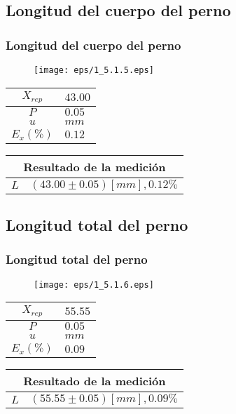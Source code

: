 \documentclass[letter,11pt]{beamer}
\begin{document}
\subsection{Longitud del cuerpo del perno}
\begin{frame}
\frametitle{Longitud del cuerpo del perno}
\vspace*{0.8cm}
\begin{figure}
\centering
\texttt{[image: eps/1\_5.1.5.eps]}
\end{figure}
\vspace*{0.4cm}
\scriptsize
\begin{tabular}{|c|>{\centering}m{1.8cm}<{\centering}|}
\hline
$X_{rep}$ &  $43.00$ \tabularnewline \hline
      $P$ &   $0.05$ \tabularnewline \hline
      $u$ &     $mm$ \tabularnewline \hline
$E_x(\%)$ &   $0.12$ \tabularnewline \hline
\end{tabular}
\quad
\begin{tabular}{|c|>{\centering}m{5.7cm}<{\centering}|}
\hline
\multicolumn{2}{|c|}{\textbf{Resultado de la medición}} \\ \hline
$L$ & $( 43.00\pm0.05)[mm], 0.12\%$ \tabularnewline \hline
\end{tabular}
\end{frame}

\subsection{Longitud total del perno}
\begin{frame}
\frametitle{Longitud total del perno}
\vspace*{0.8cm}
\begin{figure}
\centering
\texttt{[image: eps/1\_5.1.6.eps]}
\end{figure}
\vspace*{0.4cm}
\scriptsize
\begin{tabular}{|c|>{\centering}m{1.8cm}<{\centering}|}
\hline
$X_{rep}$ &  $55.55$ \tabularnewline \hline
      $P$ &   $0.05$ \tabularnewline \hline
      $u$ &     $mm$ \tabularnewline \hline
$E_x(\%)$ &   $0.09$ \tabularnewline \hline
\end{tabular}
\quad
\begin{tabular}{|c|>{\centering}m{5.7cm}<{\centering}|}
\hline
\multicolumn{2}{|c|}{\textbf{Resultado de la medición}} \\ \hline
$L$ & $( 55.55\pm0.05)[mm], 0.09\%$ \tabularnewline \hline
\end{tabular}
\end{frame}
\end{document}
